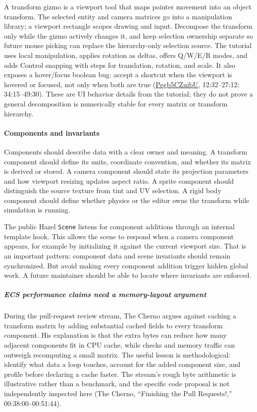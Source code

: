 A transform gizmo is a viewport tool that maps pointer movement into an object transform. The selected entity and camera matrices go into a manipulation library; a viewport rectangle scopes drawing and input. Decompose the transform only while the gizmo actively changes it, and keep selection ownership separate so future mouse picking can replace the hierarchy-only selection source. The tutorial uses local manipulation, applies rotation as deltas, offers Q/W/E/R modes, and adds Control snapping with steps for translation, rotation, and scale. It also exposes a hover/focus boolean bug: accept a shortcut when the viewport is hovered or focused, not only when both are true (\href{https://www.youtube.com/watch?v=Pegb5CZuibU}{Pegb5CZuibU}, 12:32--27:12; 34:15--49:30). These are UI behavior details from the tutorial; they do not prove a general decomposition is numerically stable for every matrix or transform hierarchy.

\paragraph{Components and invariants}\label{components-and-invariants}

Components should describe data with a clear owner and meaning. A transform component should define its units, coordinate convention, and whether its matrix is derived or stored. A camera component should state its projection parameters and how viewport resizing updates aspect ratio. A sprite component should distinguish the source texture from tint and UV selection. A rigid body component should define whether physics or the editor owns the transform while simulation is running.

The public Hazel \texttt{Scene} listens for component additions through an internal template hook. This allows the scene to respond when a camera component appears, for example by initializing it against the current viewport size. That is an important pattern: component data and scene invariants should remain synchronized. But avoid making every component addition trigger hidden global work. A future maintainer should be able to locate where invariants are enforced.

\subparagraph{ECS performance claims need a memory-layout argument}\label{ecs-performance-claims-need-a-memory-layout-argument}

During the pull-request review stream, The Cherno argues against caching a transform matrix by adding substantial cached fields to every transform component. His explanation is that the extra bytes can reduce how many adjacent components fit in CPU cache, while checks and memory traffic can outweigh recomputing a small matrix. The useful lesson is methodological: identify what data a loop touches, account for the added component size, and profile before declaring a cache faster. The stream's rough byte arithmetic is illustrative rather than a benchmark, and the specific code proposal is not independently inspected here (The Cherno, ``Finishing the Pull Requests!,'' 00:38:00--00:51:44).

